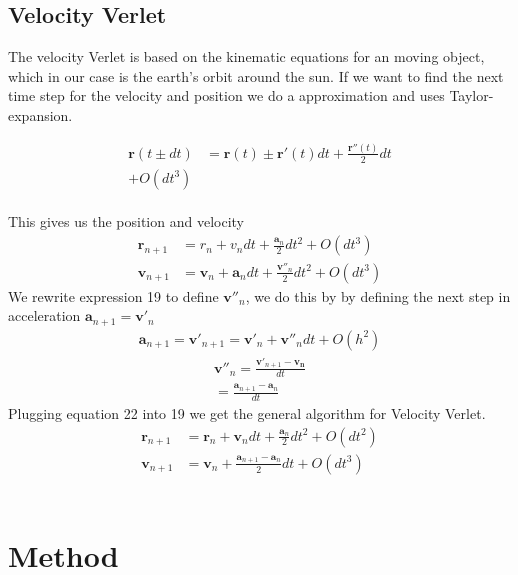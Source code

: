 \documentclass{article}
\begin{document}
\begin{multicols}{2}
\subsection{Velocity Verlet}

The velocity Verlet is based on the kinematic equations for an moving object, which in our case is the earth's orbit around the sun. If we want to find the next time step for the velocity and position we do a approximation and uses Taylor-expansion.    

\begin{align}
\mathbf{r}(t\pm dt)&=\mathbf{r}(t)\pm \mathbf{r}'(t)dt + \frac{\mathbf{r}''(t)}{2}dt\\ + O(dt^3)
\end{align}\\
This gives us the position and velocity 
\begin{align}
    \mathbf{r}_{n+1}&=r_n+v_ndt + \frac{\mathbf{a}_n}{2}dt^2+O(dt^3)\\
    \mathbf{v}_{n+1}&=\mathbf{v}_n+\mathbf{a}_ndt+\frac{\mathbf{v}''_n}{2}dt^2 + O(dt^3)
\end{align}
We rewrite expression 19 to define $\mathbf{v}''_n$, we do this by by defining the next step in acceleration $\mathbf{a}_{n+1}=\mathbf{v}'_n$ 
\begin{align}
    \mathbf{a}_{n+1}=\mathbf{v}'_{n+1}=\mathbf{v}'_n+\mathbf{v}''_ndt + O(h^2)
\end{align}
\begin{align}
        \mathbf{v}''_n=\frac{\mathbf{v}'_{n+1}-\mathbf{v_n}}{dt}\\
    =\frac{\mathbf{a}_{n+1}-\mathbf{a}_n}{dt}
\end{align}
Plugging equation 22 into 19 we get the general algorithm for Velocity Verlet. 
\begin{align}
    \mathbf{r}_{n+1}&=\mathbf{r}_n+\mathbf{v}_ndt+\frac{\mathbf{a}_n}{2}dt^2+O(dt^2)\\
    \mathbf{v}_{n+1}&=\mathbf{v}_n+\frac{\mathbf{a}_{n+1}-\mathbf{a}_n}{2}dt+O(dt^3)
\end{align}
\\
\section{Method}

\end{multicols}
\end{document}
